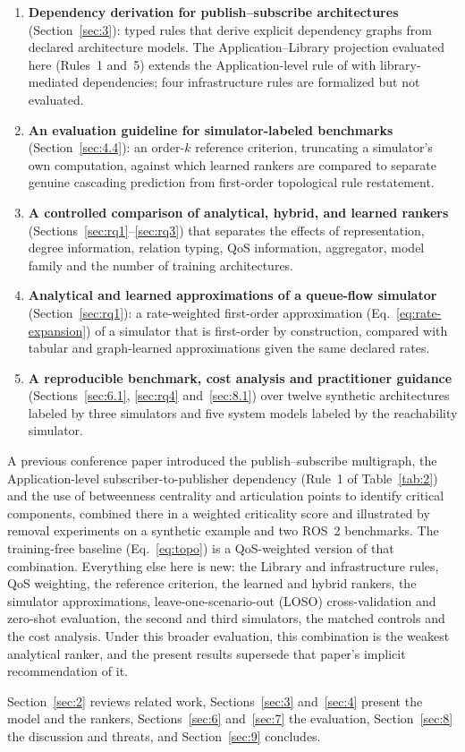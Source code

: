 \begin{enumerate}\tightlist
    \item \textbf{Dependency derivation for publish--subscribe architectures} (Section~\ref{sec:3}): typed rules that derive explicit dependency graphs from declared architecture models. The Application--Library projection evaluated here (Rules~1 and~5) extends the Application-level rule of \cite{yigit2025graph} with library-mediated dependencies; four infrastructure rules are formalized but not evaluated.
    \item \textbf{An evaluation guideline for simulator-labeled benchmarks} (Section~\ref{sec:4.4}): an order-$k$ reference criterion, truncating a simulator's own computation, against which learned rankers are compared to separate genuine cascading prediction from first-order topological rule restatement.
    \item \textbf{A controlled comparison of analytical, hybrid, and learned rankers} (Sections~\ref{sec:rq1}--\ref{sec:rq3}) that separates the effects of representation, degree information, relation typing, QoS information, aggregator, model family and the number of training architectures.
    \item \textbf{Analytical and learned approximations of a queue-flow simulator} (Section~\ref{sec:rq1}): a rate-weighted first-order approximation (Eq.~\eqref{eq:rate-expansion}) of a simulator that is first-order by construction, compared with tabular and graph-learned approximations given the same declared rates.
    \item \textbf{A reproducible benchmark, cost analysis and practitioner guidance} (Sections~\ref{sec:6.1}, \ref{sec:rq4} and~\ref{sec:8.1}) over twelve synthetic architectures labeled by three simulators and five system models labeled by the reachability simulator.
\end{enumerate}

A previous conference paper \cite{yigit2025graph} introduced the publish--subscribe multigraph, the Application-level subscriber-to-publisher dependency (Rule~1 of Table~\ref{tab:2}) and the use of betweenness centrality and articulation points to identify critical components, combined there in a weighted criticality score and illustrated by removal experiments on a synthetic example and two ROS~2 benchmarks. The training-free baseline (Eq.~\eqref{eq:topo}) is a QoS-weighted version of that combination. Everything else here is new: the Library and infrastructure rules, QoS weighting, the reference criterion, the learned and hybrid rankers, the simulator approximations, leave-one-scenario-out (LOSO) cross-validation and zero-shot evaluation, the second and third simulators, the matched controls and the cost analysis. Under this broader evaluation, this combination is the weakest analytical ranker, and the present results supersede that paper's implicit recommendation of it.

Section~\ref{sec:2} reviews related work, Sections~\ref{sec:3} and~\ref{sec:4} present the model and the rankers, Sections~\ref{sec:6} and~\ref{sec:7} the evaluation, Section~\ref{sec:8} the discussion and threats, and Section~\ref{sec:9} concludes.
